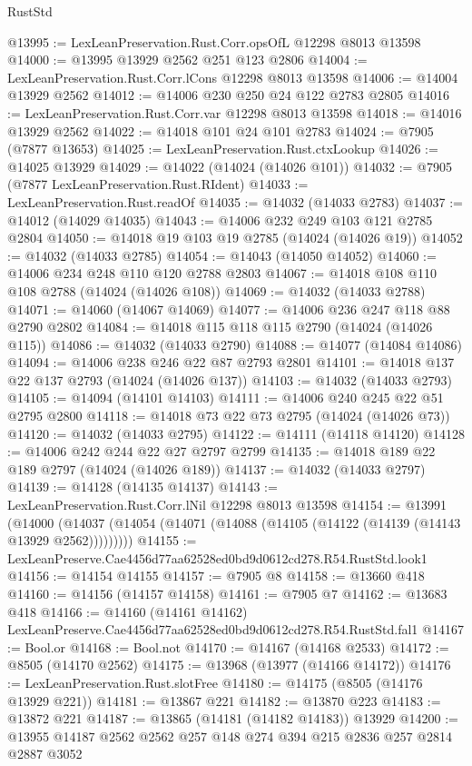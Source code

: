 \begin{lexlean}{RustStd}
\begin{coremodule}
@13995 := LexLeanPreservation.Rust.Corr.opsOfL @12298 @8013 @13598
@14000 := @13995 @13929 @2562 @251 @123 @2806
@14004 := LexLeanPreservation.Rust.Corr.lCons @12298 @8013 @13598
@14006 := @14004 @13929 @2562
@14012 := @14006 @230 @250 @24 @122 @2783 @2805
@14016 := LexLeanPreservation.Rust.Corr.var @12298 @8013 @13598
@14018 := @14016 @13929 @2562
@14022 := @14018 @101 @24 @101 @2783
@14024 := @7905 (@7877 @13653)
@14025 := LexLeanPreservation.Rust.ctxLookup
@14026 := @14025 @13929
@14029 := @14022 (@14024 (@14026 @101))
@14032 := @7905 (@7877 LexLeanPreservation.Rust.RIdent)
@14033 := LexLeanPreservation.Rust.readOf
@14035 := @14032 (@14033 @2783)
@14037 := @14012 (@14029 @14035)
@14043 := @14006 @232 @249 @103 @121 @2785 @2804
@14050 := @14018 @19 @103 @19 @2785 (@14024 (@14026 @19))
@14052 := @14032 (@14033 @2785)
@14054 := @14043 (@14050 @14052)
@14060 := @14006 @234 @248 @110 @120 @2788 @2803
@14067 := @14018 @108 @110 @108 @2788 (@14024 (@14026 @108))
@14069 := @14032 (@14033 @2788)
@14071 := @14060 (@14067 @14069)
@14077 := @14006 @236 @247 @118 @88 @2790 @2802
@14084 := @14018 @115 @118 @115 @2790 (@14024 (@14026 @115))
@14086 := @14032 (@14033 @2790)
@14088 := @14077 (@14084 @14086)
@14094 := @14006 @238 @246 @22 @87 @2793 @2801
@14101 := @14018 @137 @22 @137 @2793 (@14024 (@14026 @137))
@14103 := @14032 (@14033 @2793)
@14105 := @14094 (@14101 @14103)
@14111 := @14006 @240 @245 @22 @51 @2795 @2800
@14118 := @14018 @73 @22 @73 @2795 (@14024 (@14026 @73))
@14120 := @14032 (@14033 @2795)
@14122 := @14111 (@14118 @14120)
@14128 := @14006 @242 @244 @22 @27 @2797 @2799
@14135 := @14018 @189 @22 @189 @2797 (@14024 (@14026 @189))
@14137 := @14032 (@14033 @2797)
@14139 := @14128 (@14135 @14137)
@14143 := LexLeanPreservation.Rust.Corr.lNil @12298 @8013 @13598
@14154 := @13991
    (@14000 (@14037 (@14054 (@14071 (@14088 (@14105 (@14122 (@14139 (@14143 @13929 @2562)))))))))
@14155 := LexLeanPreserve.Cae4456d77aa62528ed0bd9d0612cd278.R54.RustStd.look1
@14156 := @14154 @14155
@14157 := @7905 @8
@14158 := @13660 @418
@14160 := @14156 (@14157 @14158)
@14161 := @7905 @7
@14162 := @13683 @418
@14166 := @14160 (@14161 @14162) LexLeanPreserve.Cae4456d77aa62528ed0bd9d0612cd278.R54.RustStd.fal1
@14167 := Bool.or
@14168 := Bool.not
@14170 := @14167 (@14168 @2533)
@14172 := @8505 (@14170 @2562)
@14175 := @13968 (@13977 (@14166 @14172))
@14176 := LexLeanPreservation.Rust.slotFree
@14180 := @14175 (@8505 (@14176 @13929 @221))
@14181 := @13867 @221
@14182 := @13870 @223
@14183 := @13872 @221
@14187 := @13865 (@14181 (@14182 @14183)) @13929
@14200 := @13955 @14187 @2562 @2562 @257 @148 @274 @394 @215 @2836 @257 @2814 @2887 @3052

\end{coremodule}
\end{lexlean}
